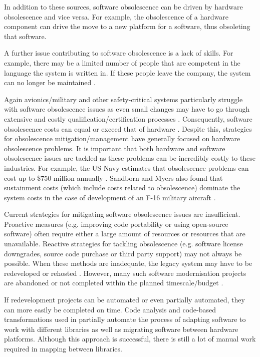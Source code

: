 \documentclass{UoYCSproject}
\begin{document}
In addition to these sources, software obsolescence can be driven by hardware obsolescence and vice versa. For example, the obsolescence of a hardware component can drive the move to a new platform for a software, thus obsoleting that software. 

A further issue contributing to software obsolescence is a lack of skills. For example, there may be a limited number of people that are competent in the language the system is written in. If these people leave the company, the system can no longer be maintained \parencite{rajagopal2014software}. 

Again avionics/military and other safety-critical systems particularly struggle with software obsolescence issues as even small changes may have to go through extensive and costly qualification/certification processes \parencite{singh2006obsolescence}. Consequently, software obsolescence costs can equal or exceed that of hardware \parencite{sandborn2007obsolescence}. Despite this, strategies for obsolescence mitigation/management have generally focused on hardware obsolescence problems. It is important that both hardware and software obsolescence issues are tackled as these problems can be incredibly costly to these industries. For example, the US Navy estimates that obsolescence problems can cost up to \$750 million annually \parencite{adams2005getting}. Sandborn and Myers also found that sustainment costs (which include costs related to obsolescence) dominate the system costs in the case of development of an F-16 military aircraft \parencite{sandborn2008designing}. 
 
Current strategies for mitigating software obsolescence issues are insufficient. Proactive measures (e.g. improving code portability or using open-source software) often require either a large amount of resources or resources that are unavailable. Reactive strategies for tackling obsolescence (e.g. software license downgrades, source code purchase or third party support) may not always be possible. When these methods are inadequate, the legacy system may have to be redeveloped or rehosted \parencite{sandborn2007obsolescence}. However, many such software modernisation projects are abandoned or not completed within the planned timescale/budget \parencite{kowalczyk2009model}. 

If redevelopment projects can be automated or even partially automated, they can more easily be completed on time.  Code analysis and code-based transformations used in \parencite{gerasimou2017technical} partially automate the process of adapting software to work with different libraries as well as migrating software between hardware platforms. Although this approach is successful, there is still a lot of manual work required in mapping between libraries.
\end{document}
